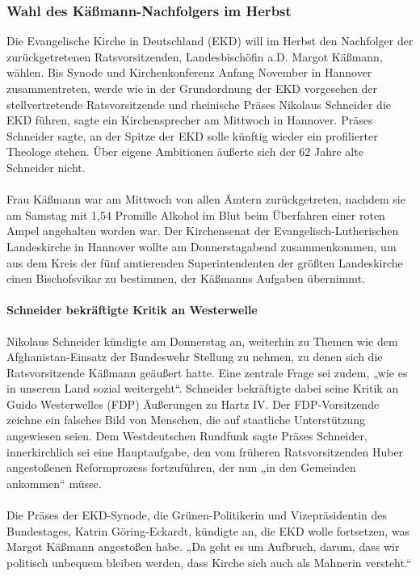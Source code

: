 \documentclass[a4paper,12pt,twoside]{scrbook}
\begin{document}
\subsubsection{Wahl des Käßmann-Nachfolgers im Herbst}
Die Evangelische Kirche in Deutschland (EKD) will im Herbst den Nachfolger der zurückgetretenen Ratsvorsitzenden, Landesbischöfin a.D. Margot Käßmann, wählen. Bis Synode und Kirchenkonferenz Anfang November in Hannover zusammentreten, werde wie in der Grundordnung der EKD vorgesehen der stellvertretende Ratsvorsitzende und rheinische Präses Nikolaus Schneider die EKD führen, sagte ein Kirchensprecher am Mittwoch in Hannover. Präses Schneider sagte, an der Spitze der EKD solle künftig wieder ein profilierter Theologe stehen. Über eigene Ambitionen äußerte sich der 62 Jahre alte Schneider nicht.
\\\\
Frau Käßmann war am Mittwoch von allen Ämtern zurückgetreten, nachdem sie am Samstag mit 1,54 Promille Alkohol im Blut beim Überfahren einer roten Ampel angehalten worden war. Der Kirchensenat der Evangelisch-Lutherischen Landeskirche in Hannover wollte am Donnerstagabend zusammenkommen, um aus dem Kreis der fünf amtierenden Superintendenten der größten Landeskirche einen Bischofsvikar zu bestimmen, der Käßmanns Aufgaben übernimmt.
\paragraph{Schneider bekräftigte Kritik an Westerwelle}
Nikolaus Schneider kündigte am Donnerstag an, weiterhin zu Themen wie dem Afghanistan-Einsatz der Bundeswehr Stellung zu nehmen, zu denen sich die Ratsvorsitzende Käßmann geäußert hatte. Eine zentrale Frage sei zudem, „wie es in unserem Land sozial weitergeht“. Schneider bekräftigte dabei seine Kritik an Guido Westerwelles (FDP) Äußerungen zu Hartz IV. Der FDP-Vorsitzende zeichne ein falsches Bild von Menschen, die auf staatliche Unterstützung angewiesen seien. Dem Westdeutschen Rundfunk sagte Präses Schneider, innerkirchlich sei eine Hauptaufgabe, den vom früheren Ratsvorsitzenden Huber angestoßenen Reformprozess fortzuführen, der nun „in den Gemeinden ankommen“ müsse.
\\\\
Die Präses der EKD-Synode, die Grünen-Politikerin und Vizepräsidentin des Bundestages, Katrin Göring-Eckardt, kündigte an, die EKD wolle fortsetzen, was Margot Käßmann angestoßen habe. „Da geht es um Aufbruch, darum, dass wir politisch unbequem bleiben werden, dass Kirche sich auch als Mahnerin versteht.“
\end{document}

